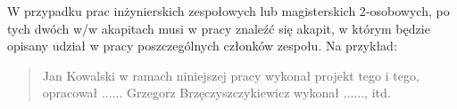 W przypadku prac inżynierskich zespołowych lub magisterskich 2-osobowych, po tych dwóch w/w akapitach 
musi w pracy znaleźć się akapit, w którym będzie opisany udział w pracy poszczególnych członków zespołu. Na przykład:

\begin{quote}
Jan Kowalski w ramach niniejszej pracy wykonał projekt tego i tego, opracował ......
Grzegorz Brzęczyszczykiewicz wykonał ......, itd. 
\end{quote}

